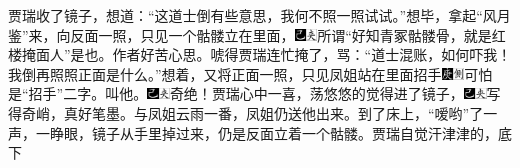 贾瑞收了镜子，想道：``这道士倒有些意思，我何不照一照试试。''想毕，拿起``风月鉴''来，向反面一照，只见一个骷髅立在里面，{\includegraphics[width=3mm]{../Images/00003}\includegraphics[width=3mm]{../Images/00012}\footnotesize \kaishu 所谓``好知青冢骷髅骨，就是红楼掩面人''是也。作者好苦心思。}唬得贾瑞连忙掩了，骂：``道士混账，如何吓我！我倒再照照正面是什么。''想着，又将正面一照，只见凤姐站在里面招手{\includegraphics[width=3mm]{../Images/00004}\includegraphics[width=3mm]{../Images/00011}\footnotesize \kaishu 可怕是``招手''二字。}叫他。{\includegraphics[width=3mm]{../Images/00003}\includegraphics[width=3mm]{../Images/00012}\footnotesize \kaishu 奇绝！}贾瑞心中一喜，荡悠悠的觉得进了镜子，{\includegraphics[width=3mm]{../Images/00003}\includegraphics[width=3mm]{../Images/00012}\footnotesize \kaishu 写得奇峭，真好笔墨。}与凤姐云雨一番，凤姐仍送他出来。到了床上，``嗳哟''了一声，一睁眼，镜子从手里掉过来，仍是反面立着一个骷髅。贾瑞自觉汗津津的，底下